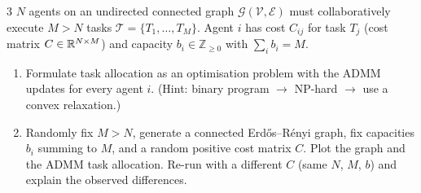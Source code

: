 \documentclass[a4paper, 11pt]{article}
\begin{document}
\clearpage
\begin{problem}{3}
$N$ agents on an undirected connected graph $\mathcal{G}(\mathcal{V},\mathcal{E})$ must collaboratively execute $M>N$ tasks $\mathcal{T}=\{T_1,\dots,T_M\}$. Agent $i$ has cost $C_{ij}$ for task $T_j$ (cost matrix $C\in\mathbb{R}^{N\times M}$) and capacity $b_i\in\mathbb{Z}_{\ge 0}$ with $\sum_ib_i=M$.
\begin{enumerate}
    \item Formulate task allocation as an optimisation problem with the ADMM updates for every agent $i$. (Hint: binary program $\to$ NP-hard $\to$ use a convex relaxation.)
    \item Randomly fix $M>N$, generate a connected Erd\H{o}s--R\'enyi graph, fix capacities $b_i$ summing to $M$, and a random positive cost matrix $C$. Plot the graph and the ADMM task allocation. Re-run with a different $C$ (same $N$, $M$, $b$) and explain the observed differences.
\end{enumerate}
\end{problem}
\end{document}
